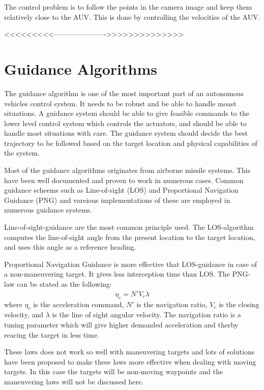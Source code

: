 	The control problem is to follow the points in the camera image and keep them relatively close to the AUV. 
	This is done by controlling the velocities of the AUV. 

	<<<<<<<<<---------------------->>>>>>>>>>>>>>

\section{Guidance Algorithms}
	\label{chap1-guidance-alg}
	The guidance algorithm is one of the most important part of an autonomous vehicles control system. It needs to be 
	robust and be able to handle moast situations. A guidance system should be able to give feasible commands to the 
	lower level control system which controls the actuators, and should be able to handle most situations with care. 
	The guidance system should decide the best trajectory to be followed based on the target location and physical 
	capabilities of the system.\cite{GuidanceReview}

	Most of the guidance algorithms originates from airborne missile systems. This have been well documented and 
	proven to work in numerous cases. Common guidance scheems such as Line-of-sight (LOS) and Proportional Navigation 
	Guidance (PNG) and vareious implementations of these are employed in numerous guidance systems.

	Line-of-sight-guidance are the most common principle used. The LOS-algorithm computes the line-of-sight angle 
	from the present location to the target location, and uses this angle as a reference heading.

	Proportional Navigation Guidance is more effective that LOS-guidance in case of a non-maneuvering target. It 
	gives less interception time than LOS. The PNG-law can be stated as the following: \cite{GuidanceReview}
	\begin{equation}
		\eta_c = N' V_c \dot{\lambda}
	\end{equation}
	where $\eta_c$ is the acceleration command, $N'$ is the navigation ratio, $V_c$ is the closing velocity, 
	and $\dot{\lambda}$ is the line of sight angular velocity. The navigation ratio is a tuning parameter which 
	will give higher demanded acceleration and therby reacing the target in less time.

	These laws does not work so well with maneuvering targets and lots of solutions have been proposed to make 
	these laws more effective when dealing with moving targets. In this case the targets will be non-moving waypoints 
	and the maneuvering laws will not be discussed here.
	




